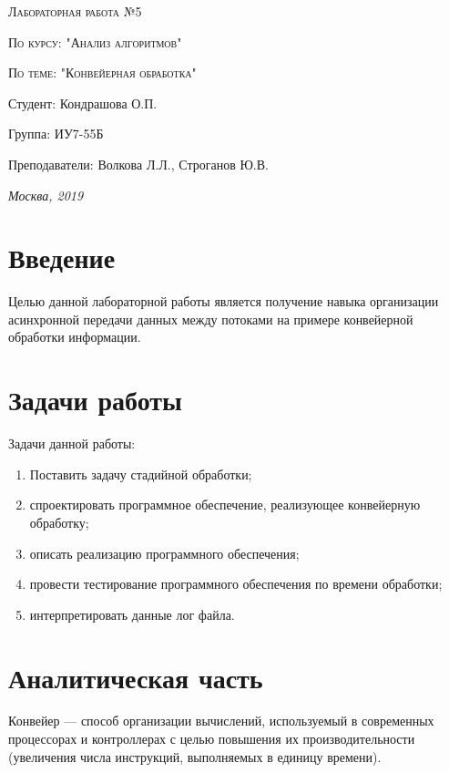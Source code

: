 \documentclass[a4paper, 14pt]{article}
\begin{document}
\begin{titlepage}
	\centering
	{\scshape\Large Лабораторная работа №5\par}
	{\scshape\Large По курсу: "Анализ алгоритмов"\par}
	{\scshape\Large По теме: "Конвейерная обработка"\par}
	\vspace{7cm}
	\Large Студент: Кондрашова О.П.\par
	\Large Группа: ИУ7-55Б\par
	\Large Преподаватели:  Волкова Л.Л., Строганов Ю.В.\par

	\vfill
	\large \textit {Москва, 2019} \par
	\end{titlepage}
	
	\setcounter{page}{2}
	\tableofcontents
	
	\newpage
	\section*{Введение}
	
	
		Целью данной лабораторной работы является получение навыка организации асинхронной передачи данных между потоками на примере конвейерной обработки информации.
		 
	\newpage
	\section*{Задачи работы}
	
	
	Задачи данной работы:
	
	\begin{enumerate}
\item Поставить задачу стадийной обработки;
\item спроектировать программное обеспечение, реализующее конвейерную обработку;
\item описать реализацию программного обеспечения;
\item провести тестирование программного обеспечения по времени обработки;
\item интерпретировать данные лог файла.
\end{enumerate}

	\newpage
\section{Аналитическая часть}
Конвейер — способ организации вычислений, используемый в современных процессорах и контроллерах с целью повышения их производительности (увеличения числа инструкций, выполняемых в единицу времени).
\end{document}
